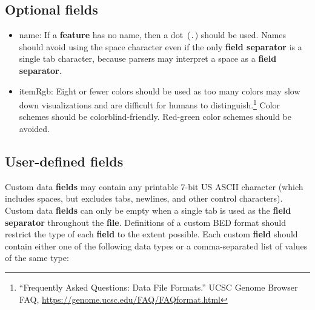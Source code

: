 \documentclass[11pt]{article}
\begin{document}
\subsection{Optional fields}\label{sec:optional}
\begin{itemize}
\item \textsf{name}: If a \textbf{feature} has no name, then a dot~(\texttt{.}) should be used.
  Names should avoid using the space character even if the only \textbf{field separator} is a single tab character, because parsers may interpret a space as a \textbf{field separator}.

\item \textsf{itemRgb}: Eight or fewer colors should be used as too many colors may slow down visualizations and are difficult for humans to distinguish.\footnote{``Frequently
    Asked Questions: Data File Formats.'' \ac{UCSC} Genome Browser FAQ,
    \url{https://genome.ucsc.edu/FAQ/FAQformat.html}}
  Color schemes should be colorblind-friendly.
  Red-green color schemes should be avoided.

\end{itemize}

\subsection{User-defined fields}

Custom data \textbf{fields} may contain any printable 7-bit US \ac{ASCII} character (which includes spaces, but excludes tabs, newlines, and other control characters).
Custom data \textbf{fields} can only be empty when a single tab is used as the \textbf{field separator} throughout the \textbf{file}.
Definitions of a custom \ac{BED} format should restrict the type of each \textbf{field} to the extent possible.
Each custom \textbf{field} should contain either one of the following data types or a comma-separated list of values of the same type:

\noindent
{}
\end{document}
